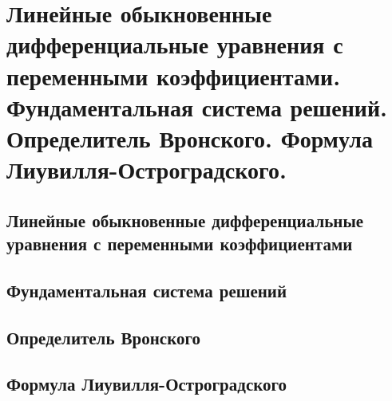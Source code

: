 \chapter{Линейные обыкновенные дифференциальные уравнения с переменными коэффициентами. Фундаментальная система решений. Определитель Вронского. Формула Лиувилля-Остроградского.}

\section{Линейные обыкновенные дифференциальные уравнения с переменными коэффициентами}
\section{Фундаментальная система решений}
\section{Определитель Вронского}
\section{Формула Лиувилля-Остроградского}